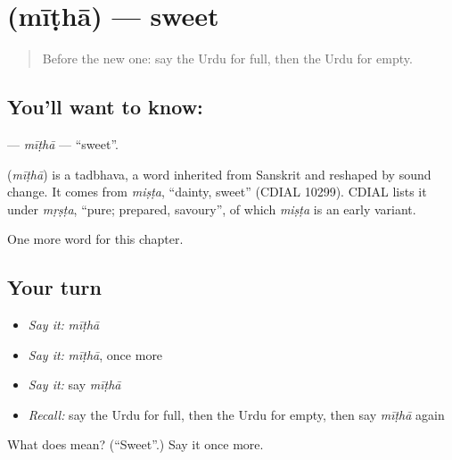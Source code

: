 \section[\texorpdfstring{\ur{میٹھا} (mīṭhā)}{میٹھا (mīṭhā)}]{ (mīṭhā) — sweet}

\label{lesson:UR-C72-mitha}



\begin{quote}
Before the new one: say the Urdu for full, then the Urdu for empty.
\end{quote}

\subsection*{You'll want to know: }
\textbf{} — \emph{mīṭhā} — \textquotedblleft{}sweet\textquotedblright{}.

\begin{cousinweb}
\textbf{} (\emph{mīṭhā}) is a tadbhava, a word inherited from Sanskrit and reshaped by sound change. It comes from \emph{miṣṭa}, \textquotedblleft{}dainty, sweet\textquotedblright{} (CDIAL 10299). CDIAL lists it under \emph{mṛṣṭa}, \textquotedblleft{}pure; prepared, savoury\textquotedblright{}, of which \emph{miṣṭa} is an early variant.
\end{cousinweb}

\begin{grammarlens}[title={What you've built}]
One more word for this chapter.
\end{grammarlens}

\subsection*{Your turn}
\begin{itemize}
\raggedright
  \item \emph{Say it:} \emph{mīṭhā}
  \item \emph{Say it:} \emph{mīṭhā}, once more
  \item \emph{Say it:} say \emph{mīṭhā}
  \item \emph{Recall:} say the Urdu for full, then the Urdu for empty, then say \emph{mīṭhā} again
\end{itemize}

\begin{tcolorbox}[breakable,colback=teal!4,colframe=teal!35!black,title={Before you move on}]
What does  mean? (\textquotedblleft{}Sweet\textquotedblright{}.) Say it once more.
\end{tcolorbox}
